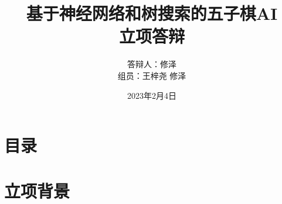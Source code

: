 \documentclass[compress]{beamer}
\begin{document}
\graphicspath{{figures/}}

\title[基于神经网络和树搜索的五子棋AI]{基于神经网络和树搜索的五子棋AI\\[2mm] 立项答辩}
\author[王梓尧]{答辩人：修泽\\[2mm] 组员：王梓尧 \hspace{2pt} 修泽}
\date{\small \vskip -10pt 2023年2月4日}

\begin{frame}
  \maketitle
\end{frame}

\section*{目录}
\frame{
  \frametitle{\secname}
  \tableofcontents[hideallsubsections]
}

\section{立项背景}
\end{document}
